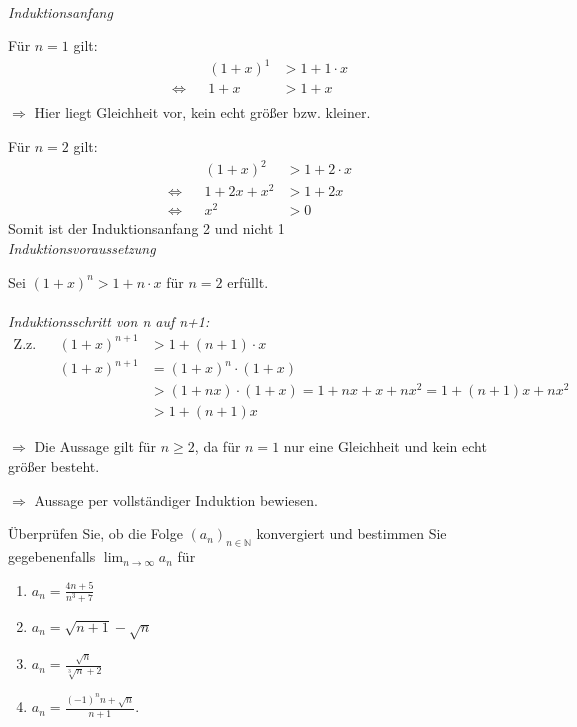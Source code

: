 \begin{lsg}\mbox{ }

    \emph{Induktionsanfang}

    Für $n=1$ gilt:
    \begin{align*}
        &&(1+x)^1&>1+1\cdot x\\
        \iff &&1+x&>1+x\\
    \end{align*}
    $\Longrightarrow$ Hier liegt Gleichheit vor, kein echt größer bzw. kleiner.

    Für $n=2$ gilt:
    \begin{align*}
        &&(1+x)^2&>1+2\cdot x\\
        \iff &&1+2x+x^2&>1+2x\\
        \iff &&x^2&>0
    \end{align*}
   Somit ist der Induktionsanfang 2 und nicht 1
   \\ 
    
    \emph{Induktionsvoraussetzung}

    Sei $(1+x)^n> 1+n\cdot x$ für $n=2$ erfüllt.\\
    \\
    \emph{Induktionsschritt von n auf n+1:}
    \begin{align*}
       \text{Z.z.} &&(1+x)^{n+1}&>1+(n+1)\cdot x\\
        &&(1+x)^{n+1}&=(1+x)^n\cdot (1+x)\\
        && &>(1+nx)\cdot(1+x)=1+nx+x+nx^2=1+(n+1)x+nx^2\\
        && &>1+(n+1)x
    \end{align*}
    
    $\Longrightarrow$ Die Aussage gilt für $n\geq2$, da für $n=1$ nur eine Gleichheit und kein echt größer besteht.
    
     $\Longrightarrow$ Aussage per vollständiger Induktion bewiesen.

\end{lsg}


\bigskip


\begin{aufg}[6 Punkte]
\"Uberpr\"ufen Sie, ob die Folge $ (a_{n})_{n\in \mathbb{N}} $ konvergiert und bestimmen Sie gegebenenfalls $\lim_{n\to\infty} a_{n} $ f\"ur 
\begin{enumerate}[label=$\mathrm{(\roman*)}$, ref=$\mathrm{\roman*}$]
\setlength{\itemsep}{2pt}
\item $a_{n} = \frac{4n + 5}{n^{3}+7}$
\item $a_{n} = \sqrt{n+1} - \sqrt{n}$
\item $a_{n} = \frac{\sqrt{n}}{\sqrt[3]{n}+2}$
\item $a_{n} = \frac{(-1)^{n}n + \sqrt{n}}{n+1}$.
\end{enumerate}
\end{aufg}


